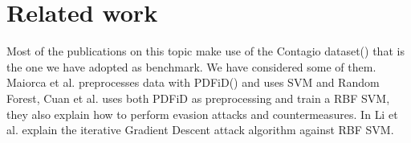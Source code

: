 \documentclass[twocolumn, switch]{article} %
\begin{document}
\section{Related work}
\label{sec:relatedwork}
Most of the publications on this topic make use of the Contagio dataset(\cite{Contagio}) that is the one we have adopted as benchmark. We have considered some of them. Maiorca et al. \cite{maiorca_giacinto_corona_1970} preprocesses data with PDFiD(\cite{PDFiD}) and uses SVM and Random Forest,  Cuan et al. \cite{cuan_damien_delaplace_valois_2018} uses both PDFiD as preprocessing and train a RBF SVM, they also explain how to perform evasion attacks and countermeasures. In \cite{li_liu_yan_yang_2022} Li et al. explain the iterative Gradient Descent attack algorithm against RBF SVM.

\end{document}
